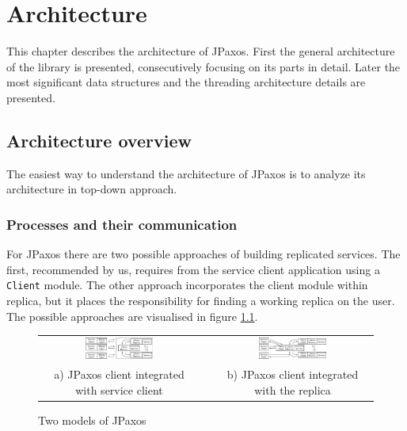\chapter{Architecture}

This chapter describes the architecture of JPaxos.
First the general architecture of the library is presented, consecutively focusing on its parts in detail.
Later the most significant data structures and the threading architecture details are presented.

\section{Architecture overview}
\indent\par
The easiest way to understand the architecture of JPaxos is to analyze its architecture in top-down approach.

\subsection{Processes and their communication}

For JPaxos there are two possible approaches of building replicated services. The first, recommended by us, 
requires from the service client application using a \texttt{Client} module. %
The other approach incorporates the client module within replica, but 
it places the responsibility for finding a working replica on the user. %
The possible approaches are visualised in figure \ref{fig:jpaxos_processes}.

\begin{figure}[h]
 \begin{tabular}{ccc}
  \includegraphics[width=0.45\textwidth]{architecture/userArchitecture1.pdf}
  &
  \hspace{0.01\textwidth}
  &
  \includegraphics[width=0.45\textwidth]{architecture/userArchitecture2.pdf}
  \\ 
  \scriptsize a) JPaxos client integrated with service client
  & & 
  \scriptsize b) JPaxos client integrated with the replica\\
 \end{tabular}
 \caption{Two models of JPaxos}\label{fig:jpaxos_processes}
\end{figure}

